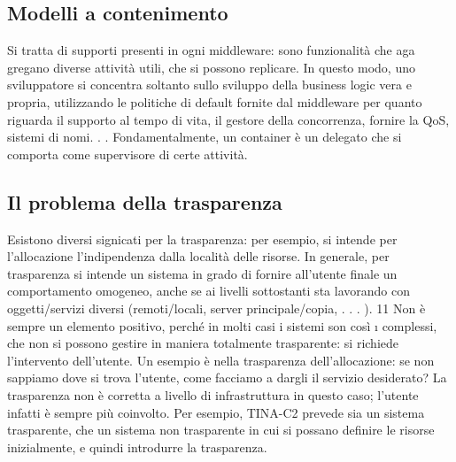 \subsection{Modelli a contenimento}
Si tratta di supporti presenti in ogni middleware: sono funzionalità che aga
gregano diverse attività utili, che si possono replicare. In questo modo, uno
sviluppatore si concentra soltanto sullo sviluppo della business logic vera e
propria, utilizzando le politiche di default fornite dal middleware per quanto
riguarda il supporto al tempo di vita, il gestore della concorrenza, fornire la
QoS, sistemi di nomi. . . Fondamentalmente, un container è un delegato che si
comporta come supervisore di certe attività.
\subsection{Il problema della trasparenza}
Esistono diversi signicati per la trasparenza: per esempio, si intende per l'allocazione l'indipendenza dalla località
delle risorse. In generale, per trasparenza si
intende un sistema in grado di fornire all'utente finale un comportamento omogeneo, anche se ai livelli sottostanti sta
lavorando con oggetti/servizi diversi
(remoti/locali, server principale/copia, . . . ).
11
Non è sempre un elemento positivo, perché in molti casi i sistemi son così
\i{}
complessi, che non si possono gestire in maniera totalmente trasparente: si
richiede l'intervento dell'utente. Un esempio è nella trasparenza dell'allocazione:
se non sappiamo dove si trova l'utente, come facciamo a dargli il servizio desiderato? La trasparenza non è corretta a
livello di infrastruttura in questo caso;
l'utente infatti è sempre più coinvolto.
Per esempio, TINA-C2 prevede sia un sistema trasparente, che un sistema
non trasparente in cui si possano definire le risorse inizialmente, e quindi introdurre la trasparenza.
